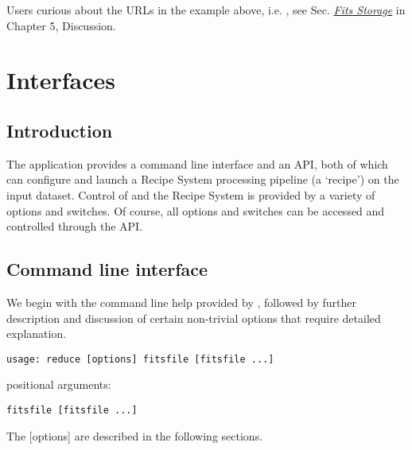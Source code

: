 \documentclass[letterpaper,10pt,english]{sphinxmanual}
\begin{document}
Users curious about the URLs in the example above, i.e. , see
Sec. {\hyperref[discuss:fitsstore]{\emph{Fits Storage}}} in Chapter 5, Discussion.


\chapter{Interfaces}
\label{interfaces:interfaces}\label{interfaces::doc}

\section{Introduction}
\label{interfaces:introduction}
The  application provides a command line interface and an API, both
of which can configure and launch a Recipe System processing pipeline (a `recipe')
on the input dataset. Control of  and the Recipe System is provided
by a variety of options and switches. Of course, all options and switches
can be accessed and controlled through the API.


\section{Command line interface}
\label{interfaces:command-line-interface}
We begin with the command line help provided by , followed by
further description and discussion of certain non-trivial options that require
detailed explanation.

\begin{Verbatim}[commandchars=\\\{\}]
usage: reduce [options] fitsfile [fitsfile ...]
\end{Verbatim}

positional arguments:

\begin{Verbatim}[commandchars=\\\{\}]
fitsfile [fitsfile ...]
\end{Verbatim}

The {[}options{]} are described in the following sections.
\end{document}
